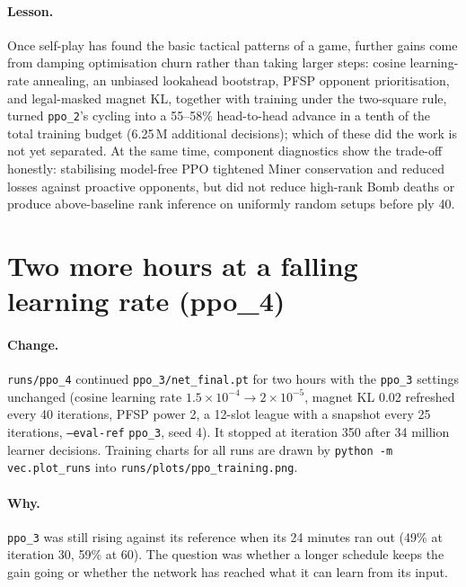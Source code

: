 \paragraph{Lesson.} Once self-play has found the basic tactical patterns of a game, further gains
come from damping optimisation churn rather than taking larger steps: cosine learning-rate
annealing, an unbiased lookahead bootstrap, PFSP opponent prioritisation, and legal-masked magnet
KL, together with training under the two-square rule, turned \texttt{ppo\_2}'s cycling into a
55--58\% head-to-head advance in a tenth of the total training budget (6.25\,M additional
decisions); which of these did the work is not yet separated. At the same time, component diagnostics show the
trade-off honestly: stabilising model-free PPO tightened Miner conservation and reduced losses
against proactive opponents, but did not reduce high-rank Bomb deaths or produce above-baseline
rank inference on uniformly random setups before ply 40.

\section{Two more hours at a falling learning rate (ppo\_4)}
\label{sec:ppo4}

\paragraph{Change.} \texttt{runs/ppo\_4} continued \texttt{ppo\_3/net\_final.pt} for two hours
with the \texttt{ppo\_3} settings unchanged (cosine learning rate $1.5\times10^{-4} \to
2\times10^{-5}$, magnet KL 0.02 refreshed every 40 iterations, PFSP power 2, a 12-slot league with a
snapshot every 25 iterations, \texttt{--eval-ref} \texttt{ppo\_3}, seed 4). It stopped at iteration
350 after 34 million learner decisions. Training charts for all runs are drawn by
\texttt{python -m vec.plot\_runs} into \texttt{runs/plots/ppo\_training.png}.

\paragraph{Why.} \texttt{ppo\_3} was still rising against its reference when its 24 minutes ran
out (49\% at iteration 30, 59\% at 60). The question was whether a longer schedule keeps the gain
going or whether the network has reached what it can learn from its input.

